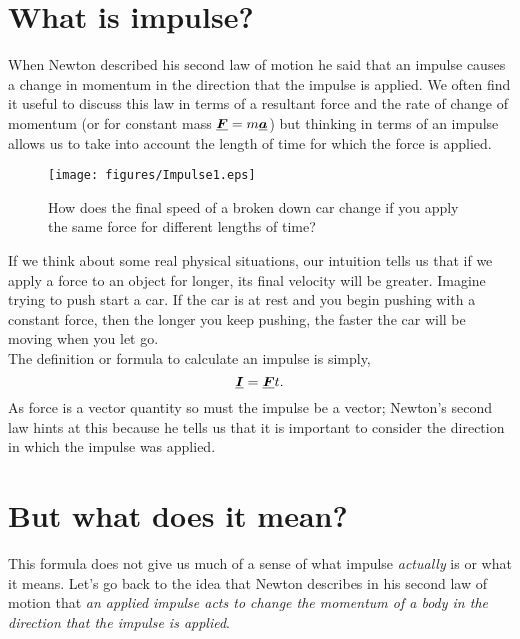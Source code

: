 




\addtolength{\topmargin}{-0.7 cm}
\setlength{\columnsep}{22pt}


\section{What is impulse?}
When Newton described his second law of motion he said that an impulse causes a change in momentum in the direction that the impulse is applied.  We often find it useful to discuss this law in terms of a resultant force and the rate of change of momentum (or for constant mass ${\mathit{\underline{\boldsymbol{F}}}}=m{\mathit{\underline{\boldsymbol{a}}}}$) but thinking in terms of an impulse allows us to take into account the length of time for which the force is applied.\\

\begin{wrapfigure}{r}{7cm}
\center
\texttt{[image: figures/Impulse1.eps]}
\caption{How does the final speed of a broken down car change if you apply the same force for different lengths of time?}\vspace{1.0cm}
\end{wrapfigure} 

\noindent If we think about some real physical situations, our intuition tells us that if we apply a force to an object for longer, its final velocity will be greater.  Imagine trying to push start a car.  If the car is at rest and you begin pushing with a constant force, then the longer you keep pushing, the faster the car will be moving when you let go.\\

\noindent The definition or formula to calculate an impulse is simply,
\begin{equation}
{\mathit{\underline{\boldsymbol{I}}}}={\mathit{\underline{\boldsymbol{F}}}}{t}.
\end {equation}
As force is a vector quantity so must the impulse be a vector; Newton's second law hints at this because he tells us that it is important to consider the direction in which the impulse was applied.


\section{But what does it mean?}
This formula does not give us much of a sense of what impulse {\it actually} is or what it means.  Let's go back to the idea that Newton describes in his second law of motion that {\it an applied impulse acts to change the momentum of a body in the direction that the impulse is applied}.\\

